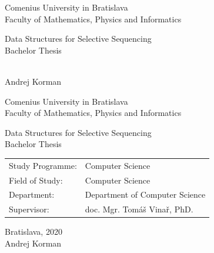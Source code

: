 \documentclass[12pt, twoside]{book}
\def\mfrok{2020}
\def\mfnazov{Data Structures for Selective Sequencing}
\def\mftyp{Bachelor Thesis}
\def\mfautor{Andrej Korman}
\def\mfskolitel{doc. Mgr. Tomáš Vinař, PhD.}
\def\mfkonzultant{tit. Meno Priezvisko, tit. }
\def\mfmiesto{Bratislava, \mfrok}
\def\mfodbor{Computer Science}
\def\program{Computer Science }
\def\mfpracovisko{ Department of Computer Science }
\begin{document}
     
\frontmatter


\thispagestyle{empty}

\begin{center}
  \sc\large
  Comenius University in Bratislava\\
  Faculty of Mathematics, Physics and Informatics

\vfill

{\LARGE\mfnazov}\\
\mftyp
\end{center}

\vfill

{\sc\large 
\noindent \mfrok\\
\mfautor
}

\cleardoublepage


\thispagestyle{empty}
\noindent

\begin{center}
\sc  
\large
  Comenius University in Bratislava\\
  Faculty of Mathematics, Physics and Informatics

\vfill

{\LARGE\mfnazov}\\
\mftyp
\end{center}

\vfill

\noindent
\begin{tabular}{ll}
Study Programme: & \program \\
Field of Study: & \mfodbor \\
Department: & \mfpracovisko \\
Supervisor: & \mfskolitel \\
\end{tabular}

\vfill


\noindent \mfmiesto\\
\mfautor

\cleardoublepage


\end{document}
